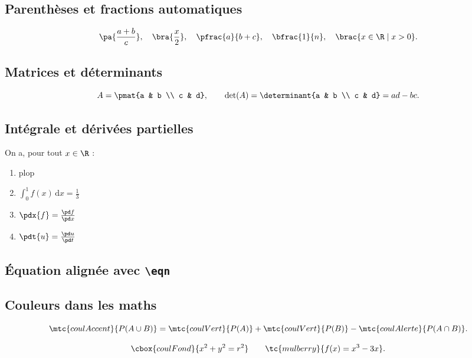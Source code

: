 \subsection{Parenthèses et fractions automatiques}

\[
	\pa{\frac{a+b}{c}}, \quad
	\bra{\frac{x}{2}}, \quad
	\pfrac{a}{b+c}, \quad
	\bfrac{1}{n}, \quad
	\brac{x \in \R \mid x > 0}.
\]

\subsection{Matrices et déterminants}

\[
	A = \pmat{a & b \\ c & d}, \qquad
	\det(A) = \determinant{a & b \\ c & d} = ad - bc.
\]

\subsection{Intégrale et dérivées partielles}

On a, pour tout $x\in\R$ :

\begin{enumerate}
	\item plop
	\item $\int_0^1 f(x)\,\mathrm{d}x = \frac{1}{3}$
	\item $\pdx{f} = \frac{\pd f}{\pd x}$
	\item $\pdt{u} = \frac{\pd u}{\pd t}$
\end{enumerate}

\subsection{Équation alignée avec \texttt{\textbackslash eqn}}


\subsection{Couleurs dans les maths}

\[
	\mtc{coulAccent}{P(A \cup B)} = \mtc{coulVert}{P(A)} +
	\mtc{coulVert}{P(B)} - \mtc{coulAlerte}{P(A \cap B)}.
\]

\[
	\cbox{coulFond}{x^2 + y^2 = r^2} \qquad
	\tc{mulberry}{f(x) = x^3 - 3x}.
\]

